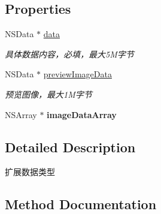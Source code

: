\subsection*{Properties}
\begin{DoxyCompactItemize}
\item 
\mbox{\label{interface_q_q_api_extend_object_a1d1d1b9c0db7387573325d5a0148beaa}} 
N\+S\+Data $\ast$ \mbox{\hyperlink{interface_q_q_api_extend_object_a1d1d1b9c0db7387573325d5a0148beaa}{data}}
\begin{DoxyCompactList}\small\item\em 具体数据内容，必填，最大5\+M字节 \end{DoxyCompactList}\item 
\mbox{\label{interface_q_q_api_extend_object_a3c1cfd5806dbf1707f31cc060defef5a}} 
N\+S\+Data $\ast$ \mbox{\hyperlink{interface_q_q_api_extend_object_a3c1cfd5806dbf1707f31cc060defef5a}{preview\+Image\+Data}}
\begin{DoxyCompactList}\small\item\em 预览图像，最大1\+M字节 \end{DoxyCompactList}\item 
\mbox{\label{interface_q_q_api_extend_object_a8ed72fe664b50d98a21ab01f0e64ce5b}} 
N\+S\+Array $\ast$ {\bfseries image\+Data\+Array}
\end{DoxyCompactItemize}


\subsection{Detailed Description}
扩展数据类型 

\subsection{Method Documentation}
\mbox{\label{interface_q_q_api_extend_object_ac4d223cfe66c04b82c0c919fca3c83df}} 
